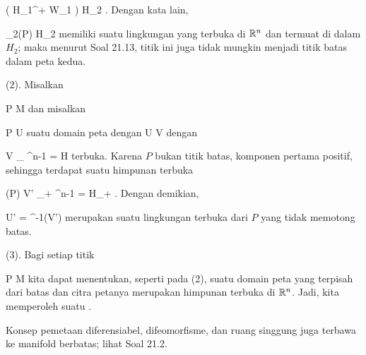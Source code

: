 {{\mavergleichskette
{\vergleichskette
{ \tilde{\varphi} \left(  H_1^+ \cap W_1  \right)
}
{ \subseteq }{ H_2
}
{  }{
}
{    }{
}
{   }{
}
}
{}{}{.}
Dengan kata lain,

\mavergleichskette
{\vergleichskette
{ \alpha_2(P)
}
{ \in }{ H_2
}
{  }{
}
{    }{
}
{   }{
}
}
{}{}{}
memiliki suatu lingkungan yang terbuka di ${\mathbb R}^n$ dan termuat di dalam $H_2$; maka menurut Soal 21.13, titik ini juga tidak mungkin menjadi titik batas dalam peta kedua.}
{}
\teilbeweis {}{}{}
{(2). Misalkan

\mavergleichskette
{\vergleichskette
{ P
}
{ \notin }{ \partial M
}
{  }{
}
{    }{
}
{   }{
}
}
{}{}{}
dan misalkan

\mavergleichskette
{\vergleichskette
{ P
}
{ \in }{ U
}
{  }{
}
{    }{
}
{   }{
}
}
{}{}{}
suatu domain peta dengan
\maabbdisp {\alpha} { U } { V
} {}
dengan

\mavergleichskette
{\vergleichskette
{ V
}
{ \subseteq }{ \R_{} \times \R^{n-1}
}
{ = }{ H
}
{    }{
}
{   }{
}
}
{}{}{}
terbuka. Karena $P$ bukan titik batas, komponen pertama
 positif, sehingga terdapat suatu himpunan terbuka

\mavergleichskette
{\vergleichskette
{ \alpha(P)
}
{ \in }{ V'
}
{ \subseteq }{ \R_{+} \times \R^{n-1}
}
{ =   }{ H_+
}
{   }{
}
}
{}{}{.}
Dengan demikian,

\mavergleichskette
{\vergleichskette
{ U'
}
{ = }{ \alpha^{-1}(V')
}
{  }{
}
{    }{
}
{   }{
}
}
{}{}{}
merupakan suatu lingkungan terbuka dari $P$ yang
 {} {}
tidak memotong batas.}
{}
\teilbeweis {}{}{}
{(3). Bagi setiap titik

\mavergleichskette
{\vergleichskette
{ P
}
{ \notin }{ \partial M
}
{  }{
}
{    }{
}
{   }{
}
}
{}{}{}
kita dapat menentukan, seperti pada (2), suatu domain peta yang terpisah dari batas dan citra petanya merupakan himpunan terbuka di ${\mathbb R}^n$. Jadi, kita memperoleh suatu
 {} {.}}
{}

}

Konsep pemetaan diferensiabel, difeomorfisme, dan ruang singgung juga terbawa ke manifold berbatas; lihat
Soal 21.2.



